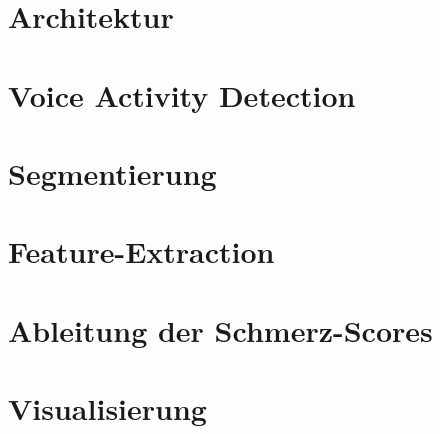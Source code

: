 \section{Architektur}
\section{Voice Activity Detection}
\section{Segmentierung}
\section{Feature-Extraction}
\section{Ableitung der Schmerz-Scores}
\section{Visualisierung}